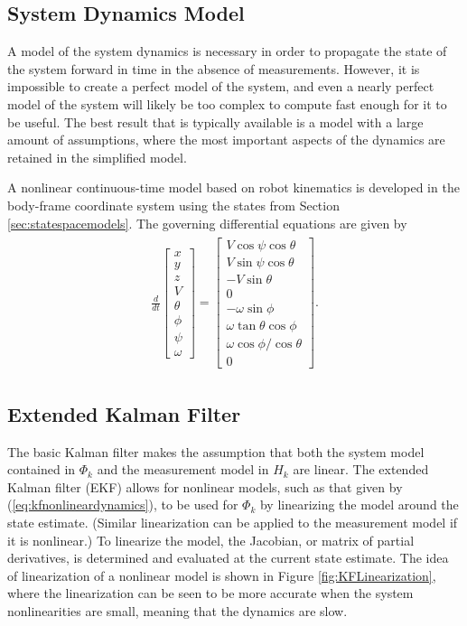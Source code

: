 \subsection{System Dynamics Model}
\label{sec:dynamics}
A model of the system dynamics is necessary in order to propagate the state of the system forward in time in the absence of measurements. However, it is impossible to create a perfect model of the system, and even a nearly perfect model of the system will likely be too complex to compute fast enough for it to be useful. The best result that is typically available is a model with a large amount of assumptions, where the most important aspects of the dynamics are retained in the simplified model.

A nonlinear continuous-time model based on robot kinematics is developed in the body-frame coordinate system using the states from Section \ref{sec:statespacemodels}. The governing differential equations are given by
\begin{align}
\label{eq:kfnonlineardynamics}
\begin{split}
\frac{d}{dt}\left[\begin{array}{c}
x \\ y \\ z \\ V \\ \theta \\ \phi \\ \psi \\ \omega
\end{array}\right] =
\left[\begin{array}{c}
V\cos\psi\cos\theta \\
V\sin\psi\cos\theta \\
-V\sin\theta \\
0 \\
-\omega\sin\phi \\
\omega\tan\theta\cos\phi \\
\omega\cos\phi/\cos\theta \\
0
\end{array}\right].
\end{split}
\end{align}

\subsection{Extended Kalman Filter}
\label{sec:extendedkf}
The basic Kalman filter makes the assumption that both the system model contained in $\Phi_k$ and the measurement model in $H_k$ are linear. The extended Kalman filter (EKF) allows for nonlinear models, such as that given by (\ref{eq:kfnonlineardynamics}), to be used for $\Phi_k$ by linearizing the model around the state estimate. (Similar linearization can be applied to the measurement model if it is nonlinear.) To linearize the model, the Jacobian, or matrix of partial derivatives, is determined and evaluated at the current state estimate. The idea of linearization of a nonlinear model is shown in Figure \ref{fig:KFLinearization}, where the linearization can be seen to be more accurate when the system nonlinearities are small, meaning that the dynamics are slow.


